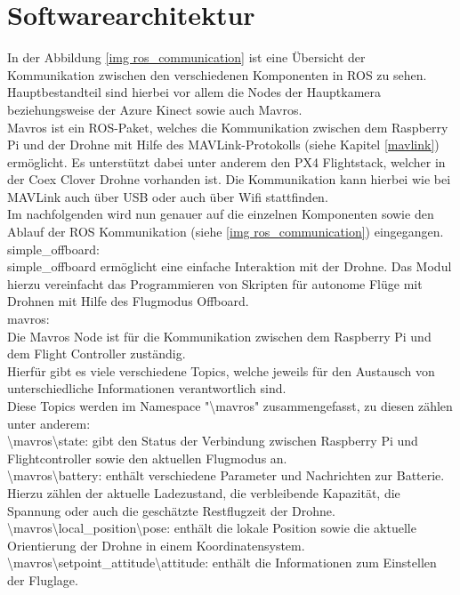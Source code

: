 \section{Softwarearchitektur} \label{softwarearchitektur:section}

In der Abbildung \ref{img ros_communication} ist eine Übersicht der Kommunikation zwischen den verschiedenen Komponenten in \ac{ROS} zu sehen. \\
Hauptbestandteil sind hierbei vor allem die Nodes der Hauptkamera beziehungsweise der Azure Kinect sowie auch Mavros. \\
Mavros ist ein ROS-Paket, welches die Kommunikation zwischen dem Raspberry Pi und der Drohne mit Hilfe des MAVLink-Protokolls (siehe Kapitel \ref{mavlink}) ermöglicht. Es unterstützt dabei unter anderem den PX4 Flightstack, welcher in der Coex Clover Drohne vorhanden ist. Die Kommunikation kann hierbei wie bei MAVLink auch über \ac{USB} oder auch über Wifi stattfinden. \cite[vgl.][]{mavros}\\
Im nachfolgenden wird nun genauer auf die einzelnen Komponenten sowie den Ablauf der ROS Kommunikation (siehe \ref{img ros_communication}) eingegangen. \\

simple\_offboard: \\
simple\_offboard ermöglicht eine einfache Interaktion mit der Drohne. Das Modul hierzu vereinfacht das Programmieren von Skripten für autonome Flüge mit Drohnen mit Hilfe des Flugmodus Offboard. \cite[vgl.][]{simple_offboard}\\

mavros: \\
Die Mavros Node ist für die Kommunikation zwischen dem Raspberry Pi und dem Flight Controller zuständig.\\
Hierfür gibt es viele verschiedene Topics, welche jeweils für den Austausch von unterschiedliche Informationen verantwortlich sind.\\
Diese Topics werden im Namespace "\textbackslash mavros" zusammengefasst, zu diesen zählen unter anderem:\\
\textbackslash mavros\textbackslash state: gibt den Status der Verbindung zwischen Raspberry Pi und Flightcontroller sowie den aktuellen Flugmodus an.\\
\textbackslash mavros\textbackslash battery: enthält verschiedene Parameter und Nachrichten zur Batterie. Hierzu zählen der aktuelle Ladezustand, die verbleibende Kapazität, die Spannung oder auch die geschätzte Restflugzeit der Drohne.\\
\textbackslash mavros\textbackslash local\_position\textbackslash pose: enthält die lokale Position sowie die aktuelle Orientierung der Drohne in einem Koordinatensystem.\\
\textbackslash mavros\textbackslash setpoint\_attitude\textbackslash attitude: enthält die Informationen zum Einstellen der Fluglage. \cite[vgl.][]{mavros}\\
 
